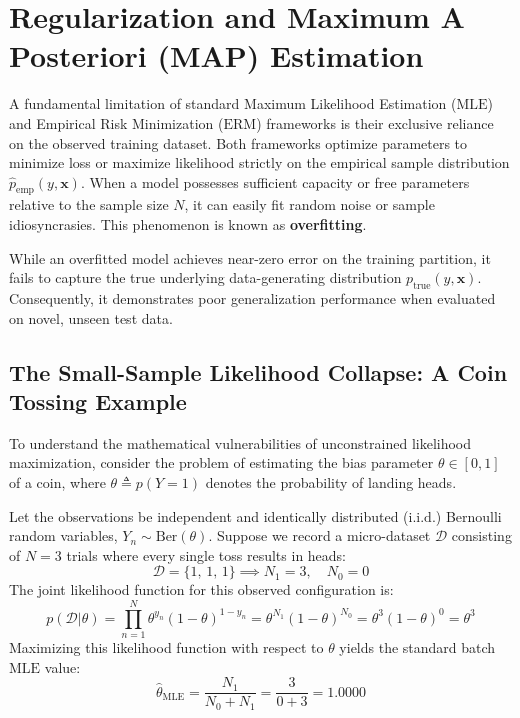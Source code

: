 \documentclass{article}
\begin{document}
\section{Regularization and Maximum A Posteriori (MAP) Estimation}

A fundamental limitation of standard Maximum Likelihood Estimation ($\text{MLE}$) and Empirical Risk Minimization ($\text{ERM}$) frameworks is their exclusive reliance on the observed training dataset. Both frameworks optimize parameters to minimize loss or maximize likelihood strictly on the empirical sample distribution $\hat{p}_{\text{emp}}(y, \mathbf{x})$. When a model possesses sufficient capacity or free parameters relative to the sample size $N$, it can easily fit random noise or sample idiosyncrasies. This phenomenon is known as \textbf{overfitting}. 

While an overfitted model achieves near-zero error on the training partition, it fails to capture the true underlying data-generating distribution $p_{\text{true}}(y, \mathbf{x})$. Consequently, it demonstrates poor generalization performance when evaluated on novel, unseen test data.

\subsection{The Small-Sample Likelihood Collapse: A Coin Tossing Example}

To understand the mathematical vulnerabilities of unconstrained likelihood maximization, consider the problem of estimating the bias parameter $\theta \in [0, 1]$ of a coin, where $\theta \triangleq p(Y = 1)$ denotes the probability of landing heads. 

Let the observations be independent and identically distributed ($\text{i.i.d.}$) Bernoulli random variables, $Y_n \sim \text{Ber}(\theta)$. Suppose we record a micro-dataset $\mathcal{D}$ consisting of $N = 3$ trials where every single toss results in heads:
\begin{equation}
\mathcal{D} = \{1, \, 1, \, 1\} \implies N_1 = 3, \quad N_0 = 0
\end{equation}
The joint likelihood function for this observed configuration is:
\begin{equation}
p(\mathcal{D} | \theta) = \prod_{n=1}^N \theta^{y_n} (1 - \theta)^{1 - y_n} = \theta^{N_1} (1 - \theta)^{N_0} = \theta^3 (1 - \theta)^0 = \theta^3
\end{equation}
Maximizing this likelihood function with respect to $\theta$ yields the standard batch $\text{MLE}$ value:
\begin{equation}
\hat{\theta}_{\text{MLE}} = \frac{N_1}{N_0 + N_1} = \frac{3}{0 + 3} = \mathbf{1.0000}
\end{equation}
\end{document}
